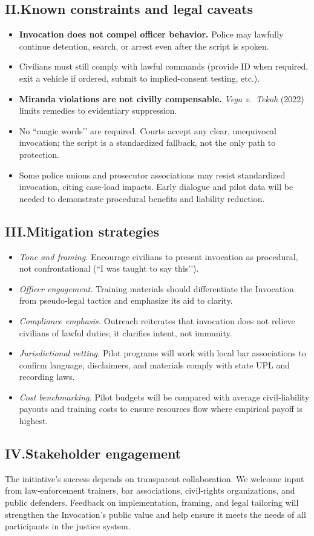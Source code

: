\subsection*{II.\;Known constraints and legal caveats}
\begin{itemize}[leftmargin=1.9em]
  \item \textbf{Invocation does not compel officer behavior.} Police may lawfully continue detention, search, or arrest even after the script is spoken.
  \item Civilians must still comply with lawful commands (provide ID when required, exit a vehicle if ordered, submit to implied‑consent testing, etc.).
  \item \textbf{Miranda violations are not civilly compensable.} \textit{Vega v.\ Tekoh} (2022) limits remedies to evidentiary suppression.
  \item No ``magic words’’ are required. Courts accept any clear, unequivocal invocation; the script is a standardized fallback, not the only path to protection.
  \item Some police unions and prosecutor associations may resist standardized invocation, citing case‑load impacts. Early dialogue and pilot data will be needed to demonstrate procedural benefits and liability reduction.
\end{itemize}

\subsection*{III.\;Mitigation strategies}
\begin{itemize}[leftmargin=1.9em]
  \item \textit{Tone and framing.} Encourage civilians to present invocation as procedural, not confrontational (``I was taught to say this’’).
  \item \textit{Officer engagement.} Training materials should differentiate the Invocation from pseudo‑legal tactics and emphasize its aid to clarity.
  \item \textit{Compliance emphasis.} Outreach reiterates that invocation does not relieve civilians of lawful duties; it clarifies intent, not immunity.
  \item \textit{Jurisdictional vetting.} Pilot programs will work with local bar associations to confirm language, disclaimers, and materials comply with state UPL and recording laws.
  \item \textit{Cost benchmarking.} Pilot budgets will be compared with average civil‑liability payouts and training costs to ensure resources flow where empirical payoff is highest.
\end{itemize}

\subsection*{IV.\;Stakeholder engagement}
The initiative’s success depends on transparent collaboration. We welcome input from law‑enforcement trainers, bar associations, civil‑rights organizations, and public defenders. Feedback on implementation, framing, and legal tailoring will strengthen the Invocation’s public value and help ensure it meets the needs of all participants in the justice system.
